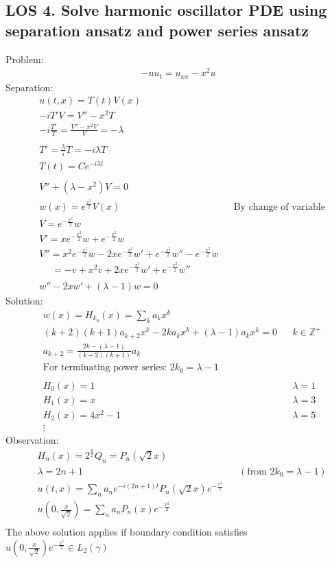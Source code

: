 \documentclass[12pt, a4paper]{article}
\begin{document}
\subsection*{LOS 4. Solve harmonic oscillator PDE using separation ansatz and power series ansatz}
Problem:
\begin{align*}
    -uu_t = u_{xx} - x^2u
\end{align*}
Separation:
\begin{align*}
    &u(t, x) = T(t)V(x)\\
    &-iT'V = V'' - x^2T\\
    &-i\frac{T'}{T} = \frac{V''-x^2V}{V} = -\lambda\\\\
    &T' = \frac{\lambda}{i}T = -i\lambda T\\
    &T(t) = Ce^{-i\lambda t}\\\\
    &V''+(\lambda - x^2)V = 0\\
    &w(x) = e^{\frac{x^2}{2}}V(x)&& \text{By change of variable}\\
    &V = e^{-\frac{x^2}{2}}w\\
    &V' = xe^{-\frac{x^2}{2}}w + e^{-\frac{x^2}{2}}w\\
    &V'' = x^2e^{-\frac{x^2}{2}}w - 2xe^{-\frac{x^2}{2}}w' + e^{-\frac{x^2}{2}}w'' - e^{-\frac{x^2}{2}}w\\
    &\quad\; =-v + x^2v + 2xe^{-\frac{x^2}{2}}w' + e^{-\frac{x^2}{2}}w''\\\\
    &w'' - 2xw' + (\lambda - 1)w  = 0
\end{align*}
Solution:
\begin{align*}
    &w(x) = H_{k_0}(x) = \sum_k a_k x^k\\
    &(k+2)(k+1)a_{k+2}x^k - 2ka_kx^k+(\lambda -1)a_kx^k=0&&k\in\mathbb{Z}^+\\
    &a_{k+2}=\frac{2k-(\lambda -1)}{(k+2)(k+1)}a_k\\
    &\text{For terminating power series: }2k_0 = \lambda - 1\\\\
    &H_0(x) = 1&&\lambda = 1\\
    &H_1(x) = x&&\lambda = 3\\
    &H_2(x) = 4x^2-1&&\lambda = 5\\
    &\vdots
\end{align*}
Observation:
\begin{align*}
    &H_n(x) = 2^\frac{n}{2}Q_n = P_n(\sqrt{2}x)\\
    &\lambda = 2n+1 && (\text{from }2k_0 = \lambda - 1)\\
    &u(t, x) = \sum_n a_ne^{-i(2n+1)t}P_n(\sqrt{2}x)e^{-\frac{x^2}{2}}\\
    &u(0, \frac{x}{\sqrt{2}}) = \sum_n a_nP_n(x)e^{-\frac{x^2}{2}}\\
\end{align*}
The above solution applies if boundary condition satisfies $u(0, \frac{x}{\sqrt{2}})e^{-\frac{x^2}{2}} \in L_2(\gamma)$
\vspace{0.3em}
\end{document}
